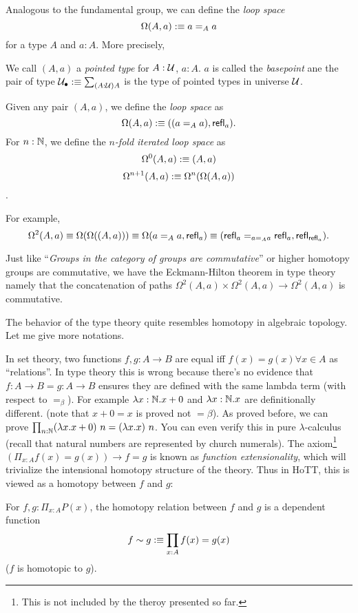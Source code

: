 Analogous to the fundamental group, we can define the {\it loop space} 
$$\Omega(A, a):\equiv a=_Aa$$ for a type $A$ and $a: A$. More precisely,

\newcommand{\pointed}{_\bullet}
\begin{definition}
    We call $(A, a)$ a {\it pointed type} for $A:\mathcal{U}$, $a:A$.
    $a$ is called the {\it basepoint} ane the pair of type 
    $\universe\pointed\defn\sum_{(A:\universe)A}$ is the type of pointed 
    types in universe $\mathcal{U}$.
\end{definition}

\begin{definition}
    Given any pair $(A, a)$, we define the {\it loop space} as 
    $$ \Omega(A,a):\equiv ((a=_A a),\text{\sf refl}_a).$$
    For $n:\mathbb{N}$, we define the {\it$n$-fold iterated loop space} as
    $$\Omega^0(A,a):\equiv(A,a)$$
    $$\Omega^{n+1}(A,a):\equiv\Omega^n(\Omega(A, a))$$.
\end{definition}

For example, 
$$
    \Omega^2(A,a)\equiv\Omega(\Omega((A,a)))\equiv\Omega(a=_Aa,\text{\sf refl}_a)
    \equiv(\text{\sf refl}_a=_{a=_Aa}\text{\sf refl}_a, \text{\sf refl}_{\text{\sf refl}_a}).
$$

Just like ``{\it Groups in the category of groups are commutative}''
\cite{cat-awodey} or higher homotopy groups are commutative, we have
the Eckmann-Hilton theorem in type theory namely that the concatenation of 
paths $\Omega^2(A,a)\times\Omega^2(A,a)\to\Omega^2(A,a)$ is commutative.

The behavior of the type theory quite resembles homotopy in algebraic
topology. Let me give more notations.

In set theory, two functions $f,g: A\to B$ are equal iff 
$f(x)=g(x)\forall x\in A$ as ``relations''. In type theory this is wrong
because there's no evidence that $f: A\to B=g: A\to B$ ensures they are
defined with the same lambda term (with respect to $=_\beta$). For example 
$\lambda x:\mathbb{N}. x+0$ and $\lambda x:\mathbb{N}. x$ are definitionally different.
(note that $x+0=x$ is proved not $=\beta$). As proved before, we can
prove $\prod_{n:\nat}(\lambda x.x+0)\ n=(\lambda x.x)\ n$. You can even
verify this in pure $\lambda$-calculus (recall that natural numbers are
represented by church numerals). 
The axiom\footnote{This is not included by the theroy presented so far.}
$(\Pi_{x:A}f(x)=g(x))\to f = g$ is known as {\it function extensionality},
which will trivialize the intensional homotopy structure of the theory.
Thus in HoTT, this is viewed as a homotopy between $f$ and $g$:
\begin{definition}
    For $f,g:\Pi_{x:A}P(x)$, the homotopy relation between $f$ and $g$
    is a dependent function
    $$
        f\sim g:\equiv \prod_{x:A}f(x)=g(x)
    $$
    ($f$ is homotopic to $g$).
\end{definition}

